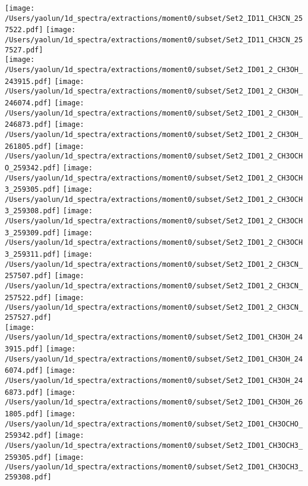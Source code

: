 \begin{figure*}[htbp!]
  \texttt{[image: /Users/yaolun/1d\_spectra/extractions/moment0/subset/Set2\_ID11\_CH3CN\_257522.pdf]}
  \texttt{[image: /Users/yaolun/1d\_spectra/extractions/moment0/subset/Set2\_ID11\_CH3CN\_257527.pdf]}
  \\
  \texttt{[image: /Users/yaolun/1d\_spectra/extractions/moment0/subset/Set2\_ID01\_2\_CH3OH\_243915.pdf]}
  \texttt{[image: /Users/yaolun/1d\_spectra/extractions/moment0/subset/Set2\_ID01\_2\_CH3OH\_246074.pdf]}
  \texttt{[image: /Users/yaolun/1d\_spectra/extractions/moment0/subset/Set2\_ID01\_2\_CH3OH\_246873.pdf]}
  \texttt{[image: /Users/yaolun/1d\_spectra/extractions/moment0/subset/Set2\_ID01\_2\_CH3OH\_261805.pdf]}
  \texttt{[image: /Users/yaolun/1d\_spectra/extractions/moment0/subset/Set2\_ID01\_2\_CH3OCHO\_259342.pdf]}
  \texttt{[image: /Users/yaolun/1d\_spectra/extractions/moment0/subset/Set2\_ID01\_2\_CH3OCH3\_259305.pdf]}
  \texttt{[image: /Users/yaolun/1d\_spectra/extractions/moment0/subset/Set2\_ID01\_2\_CH3OCH3\_259308.pdf]}
  \texttt{[image: /Users/yaolun/1d\_spectra/extractions/moment0/subset/Set2\_ID01\_2\_CH3OCH3\_259309.pdf]}
  \texttt{[image: /Users/yaolun/1d\_spectra/extractions/moment0/subset/Set2\_ID01\_2\_CH3OCH3\_259311.pdf]}
  \texttt{[image: /Users/yaolun/1d\_spectra/extractions/moment0/subset/Set2\_ID01\_2\_CH3CN\_257507.pdf]}
  \texttt{[image: /Users/yaolun/1d\_spectra/extractions/moment0/subset/Set2\_ID01\_2\_CH3CN\_257522.pdf]}
  \texttt{[image: /Users/yaolun/1d\_spectra/extractions/moment0/subset/Set2\_ID01\_2\_CH3CN\_257527.pdf]}
  \\
  \texttt{[image: /Users/yaolun/1d\_spectra/extractions/moment0/subset/Set2\_ID01\_CH3OH\_243915.pdf]}
  \texttt{[image: /Users/yaolun/1d\_spectra/extractions/moment0/subset/Set2\_ID01\_CH3OH\_246074.pdf]}
  \texttt{[image: /Users/yaolun/1d\_spectra/extractions/moment0/subset/Set2\_ID01\_CH3OH\_246873.pdf]}
  \texttt{[image: /Users/yaolun/1d\_spectra/extractions/moment0/subset/Set2\_ID01\_CH3OH\_261805.pdf]}
  \texttt{[image: /Users/yaolun/1d\_spectra/extractions/moment0/subset/Set2\_ID01\_CH3OCHO\_259342.pdf]}
  \texttt{[image: /Users/yaolun/1d\_spectra/extractions/moment0/subset/Set2\_ID01\_CH3OCH3\_259305.pdf]}
  \texttt{[image: /Users/yaolun/1d\_spectra/extractions/moment0/subset/Set2\_ID01\_CH3OCH3\_259308.pdf]}

\end{figure*}
